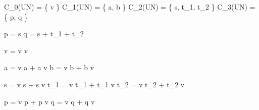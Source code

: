 

C_{0}(UN) = \{ v \}
C_{1}(UN) = \{ a, b \}
C_{2}(UN) = \{ s, t_{1}, t_{2} \}
C_{3}(UN) = \{ p, q \}


\partial p = s
\partial q = s + t_{1} + t_{2}


\Delta v = v \otimes v

\Delta a = v \otimes a + a \otimes v
\Delta b = v \otimes b + b \otimes v

\Delta s = v \otimes s + s \otimes v
\Delta t_{1} = v \otimes t_{1} + t_{1} \otimes v
\Delta t_{2} = v \otimes t_{2} + t_{2} \otimes v

\Delta p = v \otimes p + p \otimes v
\Delta q = v \otimes q + q \otimes v
